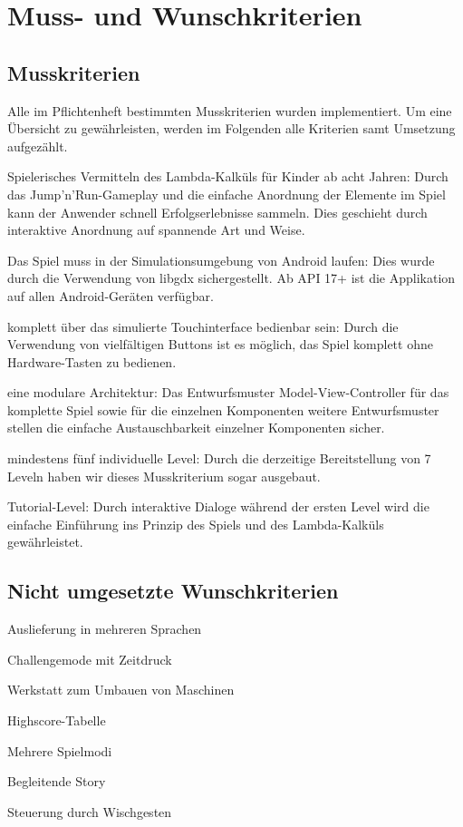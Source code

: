 \documentclass[parskip=full]{scrreprt}
\begin{document}
\chapter{Muss- und Wunschkriterien}

\section{Musskriterien}

Alle im Pflichtenheft bestimmten Musskriterien wurden implementiert. Um eine Übersicht zu gewährleisten, werden im Folgenden alle Kriterien samt Umsetzung aufgezählt.

\begin{description}
	\item Spielerisches Vermitteln des Lambda-Kalküls für Kinder ab acht Jahren: Durch das Jump'n'Run-Gameplay und die einfache Anordnung der Elemente im Spiel kann der Anwender schnell Erfolgserlebnisse sammeln. Dies geschieht durch interaktive Anordnung auf spannende Art und Weise.
	\item Das Spiel muss in der Simulationsumgebung von Android laufen: Dies wurde durch die Verwendung von libgdx sichergestellt. Ab API 17+ ist die Applikation auf allen Android-Geräten verfügbar.
	\item komplett über das simulierte Touchinterface bedienbar sein: Durch die Verwendung von vielfältigen Buttons ist es möglich, das Spiel komplett ohne Hardware-Tasten zu bedienen.
	\item eine modulare Architektur: Das Entwurfsmuster Model-View-Controller für das komplette Spiel sowie für die einzelnen Komponenten weitere Entwurfsmuster stellen die einfache Austauschbarkeit einzelner Komponenten sicher.
	\item mindestens fünf individuelle Level: Durch die derzeitige Bereitstellung von 7 Leveln haben wir dieses Musskriterium sogar ausgebaut.
	\item Tutorial-Level: Durch interaktive Dialoge während der ersten Level wird die einfache Einführung ins Prinzip des Spiels und des Lambda-Kalküls gewährleistet.
\end{description}

\section{Nicht umgesetzte Wunschkriterien}

\begin{description}
	\item Auslieferung in mehreren Sprachen
	\item Challengemode mit Zeitdruck
	\item Werkstatt zum Umbauen von Maschinen
	\item Highscore-Tabelle
	\item Mehrere Spielmodi
	\item Begleitende Story
	\item Steuerung durch Wischgesten
\end{description}
\end{document}
